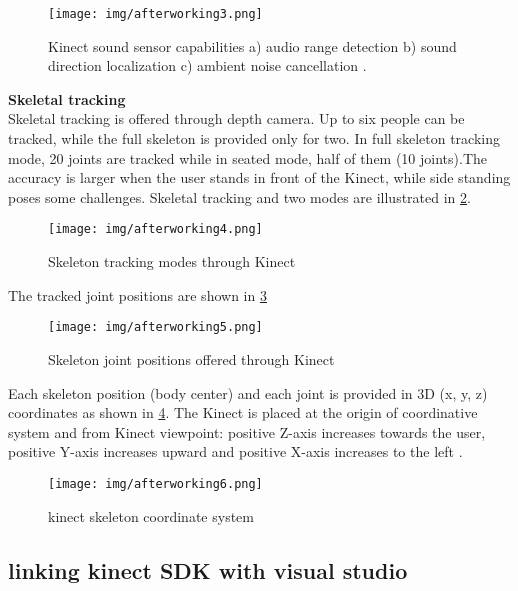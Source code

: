 \begin{figure}[H]
\centering
\texttt{[image: img/afterworking3.png]}
\caption{Kinect sound sensor capabilities a) audio range detection b) sound direction localization c) ambient noise cancellation .
}
\label{fig:cam5}
\end{figure}


\textbf{Skeletal tracking }\\
Skeletal tracking is offered through depth camera. Up to six people can be tracked, while the full skeleton is provided only for two. In full skeleton tracking mode, 20 joints are tracked while in seated mode, half of them (10 joints).The accuracy is larger when the user stands in front of the Kinect, while side standing poses some challenges. Skeletal tracking and two modes are  illustrated in \ref{fig:cam6}.

\begin{figure}[H]
\centering
\texttt{[image: img/afterworking4.png]}
\caption{Skeleton tracking modes through Kinect }
\label{fig:cam6}
\end{figure}

The tracked joint positions are shown in \ref{fig:cam77}
\begin{figure}[H]
\centering
\texttt{[image: img/afterworking5.png]}
\caption{Skeleton joint positions offered  through Kinect }
\label{fig:cam77}
\end{figure}

Each skeleton position (body center) and each joint is provided in 3D (x, y, z) coordinates as 
shown in \ref{fig:cam7}. The Kinect is placed at the origin of coordinative system and from Kinect viewpoint: positive Z-axis increases towards the user, positive  Y-axis increases upward and positive  X-axis increases to the left .  

\begin{figure}[H]
\centering
\texttt{[image: img/afterworking6.png]}
\caption{kinect skeleton coordinate system  }
\label{fig:cam7}
\end{figure}


 
\subsection{linking  kinect SDK with visual studio}

